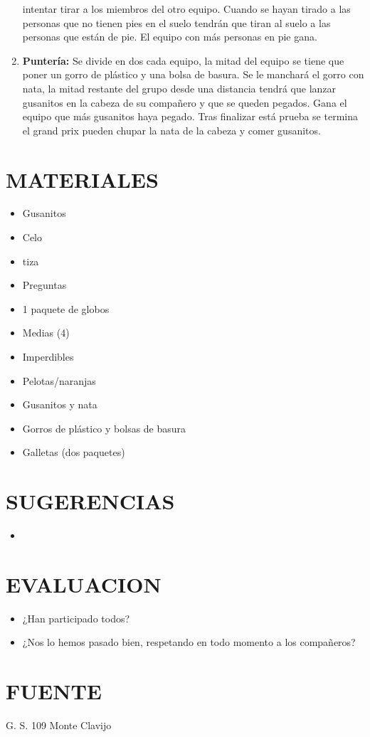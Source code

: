 \documentclass[72pt]{article}
\begin{document}
\begin{enumerate}
		intentar tirar a los miembros del otro equipo. Cuando se hayan
		tirado a las personas que no tienen pies en el suelo tendrán que
		tiran al suelo a las personas que están de pie. El equipo con más
		personas en pie gana.
	\item \textbf{Puntería:}
		Se divide en dos cada equipo, la mitad del equipo se tiene que
		poner un gorro de plástico y una bolsa de basura. Se le manchará el
		gorro con nata, la mitad restante del grupo desde una distancia
		tendrá que lanzar gusanitos en la cabeza de su compañero y que se
		queden pegados. Gana el equipo que más gusanitos haya pegado.
		Tras finalizar está prueba se termina el grand prix pueden chupar la
		nata de la cabeza y comer gusanitos.
\end{enumerate}

\section*{MATERIALES}
\begin{itemize}
    \item Gusanitos
    \item Celo
	\item tiza
	\item Preguntas
	\item 1 paquete de globos
	\item Medias (4)
	\item Imperdibles
	\item Pelotas/naranjas
	\item Gusanitos y nata
	\item Gorros de plástico y bolsas de basura
	\item Galletas (dos paquetes)
\end{itemize}
\section*{SUGERENCIAS}

\begin{itemize}
    \item
\end{itemize}

\section*{EVALUACION}
\begin{itemize}
    \item ¿Han participado todos?
	\item ¿Nos lo hemos pasado bien, respetando en todo momento a los
compañeros?
\end{itemize}

\section*{FUENTE}
G. S. 109 Monte Clavijo
\end{document}
